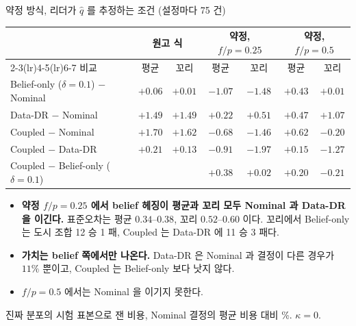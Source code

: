 \documentclass[aspectratio=169,11pt]{beamer}
\begin{document}
\begin{frame}{약정 방식, 리더가 $\hat q$ 를 추정하는 조건 (설정마다 75 건)}
\begin{center}
\footnotesize
\begin{tabular}{lcccccc}
\toprule
 & \multicolumn{2}{c}{원고 식} & \multicolumn{2}{c}{약정, $f/p = 0.25$} & \multicolumn{2}{c}{약정, $f/p = 0.5$}\\
\cmidrule(lr){2-3}\cmidrule(lr){4-5}\cmidrule(lr){6-7}
비교 & 평균 & 꼬리 & 평균 & 꼬리 & 평균 & 꼬리\\
\midrule
Belief-only ($\delta = 0.1$) $-$ Nominal & $+0.06$ & $+0.01$ & $\mathbf{-1.07}$ & $\mathbf{-1.48}$ & $+0.43$ & $+0.01$\\
Data-DR $-$ Nominal & $+1.49$ & $+1.49$ & $+0.22$ & $+0.51$ & $+0.47$ & $+1.07$\\
Coupled $-$ Nominal & $+1.70$ & $+1.62$ & $-0.68$ & $-1.46$ & $+0.62$ & $-0.20$\\
Coupled $-$ Data-DR & $+0.21$ & $+0.13$ & $\mathbf{-0.91}$ & $\mathbf{-1.97}$ & $+0.15$ & $-1.27$\\
Coupled $-$ Belief-only ($\delta = 0.1$) & & & $+0.38$ & $+0.02$ & $+0.20$ & $-0.21$\\
\bottomrule
\end{tabular}
\end{center}
\begin{itemize}
  \item \textbf{약정 $f/p = 0.25$ 에서 belief 헤징이 평균과 꼬리 모두 Nominal 과 Data-DR 을 이긴다.} 표준오차는 평균 $0.34$--$0.38$, 꼬리 $0.52$--$0.60$ 이다. 꼬리에서 Belief-only 는 도시 조합 12 승 1 패, Coupled 는 Data-DR 에 11 승 3 패다.
  \item \textbf{가치는 belief 쪽에서만 나온다.} Data-DR 은 Nominal 과 결정이 다른 경우가 $11\%$ 뿐이고, Coupled 는 Belief-only 보다 낫지 않다.
  \item $f/p = 0.5$ 에서는 Nominal 을 이기지 못한다.
\end{itemize}
{\footnotesize 진짜 분포의 시험 표본으로 잰 비용, Nominal 결정의 평균 비용 대비 \%. $\kappa = 0$.}
\end{frame}
\end{document}
